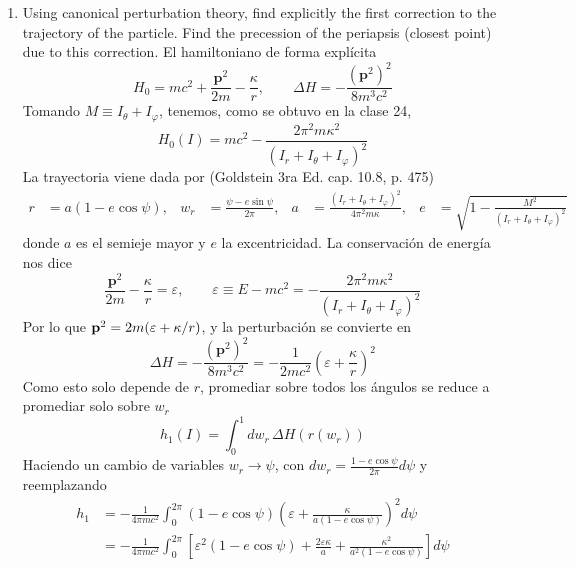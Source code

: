 \documentclass[]{article}
\numberwithin{equation}{section}
\begin{document}
\begin{enumerate}
	\item[a.] Using canonical perturbation theory, find explicitly the first correction to the trajectory of the particle. Find the precession of the periapsis (closest point) due to this correction.
	\resp El hamiltoniano de forma explícita	
	\begin{equation}
		H_0 = mc^2 + \frac{\mathbf{p}^2}{2m} - \frac{\kappa}{r}, \qquad \Delta H = -\frac{(\mathbf{p}^2)^2}{8m^3c^2}
	\end{equation}
	Tomando $M \equiv I_\theta + I_\varphi$, tenemos, como se obtuvo en la clase 24,
	\begin{equation}
		H_0(I) = mc^2 - \frac{2\pi^2 m\kappa^2}{\left(I_r + I_\theta + I_\varphi\right)^2}
	\end{equation}
	La trayectoria viene dada por (Goldstein 3ra Ed. cap. 10.8, p. 475)
	\begin{align}
		r &= a(1 - e\cos\psi), & w_r &= \frac{\psi - e\sin\psi}{2\pi}, & a &= \frac{\left(I_r + I_\theta + I_\varphi\right)^2}{4\pi^2 m\kappa}, & e &= \sqrt{1 - \frac{M^2}{\left(I_r + I_\theta + I_\varphi\right)^2}}
	\end{align}
	donde $a$ es el semieje mayor y $e$ la excentricidad. La conservación de energía nos dice
	\begin{equation}
		\frac{\mathbf{p}^2}{2m} - \frac{\kappa}{r} = \varepsilon, \qquad \varepsilon \equiv E - mc^2 = -\frac{2\pi^2 m\kappa^2}{\left(I_r + I_\theta + I_\varphi\right)^2}
	\end{equation}
	Por lo que $\mathbf{p}^2 = 2m(\varepsilon + \kappa/r)$, y la perturbación se convierte en
	\begin{equation}
		\Delta H = -\frac{(\mathbf{p}^2)^2}{8m^3c^2} = -\frac{1}{2mc^2}\left(\varepsilon + \frac{\kappa}{r}\right)^2
	\end{equation}
	Como esto solo depende de $r$, promediar sobre todos los ángulos se reduce a promediar solo sobre $w_r$
	\begin{equation}
		h_1(I) = \int_0^1 dw_r\, \Delta H(r(w_r))
	\end{equation}
	Haciendo un cambio de variables $w_r \to \psi$, con $dw_r = \frac{1-e\cos\psi}{2\pi}d\psi$ y reemplazando
	\begin{align}
		h_1 &= -\frac{1}{4\pi mc^2}\int_0^{2\pi}(1-e\cos\psi)\left(\varepsilon + \frac{\kappa}{a(1-e\cos\psi)}\right)^2 d\psi\nonumber\\
		&= -\frac{1}{4\pi mc^2}\int_0^{2\pi} \left[\varepsilon^2(1-e\cos\psi) + \frac{2\varepsilon\kappa}{a} + \frac{\kappa^2}{a^2(1-e\cos\psi)}\right] d\psi\nonumber\\

\end{align}
\end{enumerate}
\end{document}
